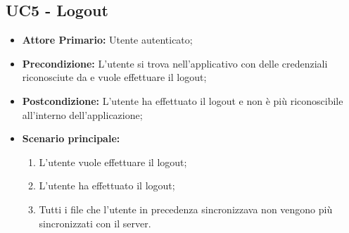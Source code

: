\subsection{UC5 - Logout}
\begin{itemize}
\item \textbf{Attore Primario:} Utente autenticato;
\item \textbf{Precondizione:} L'utente si trova nell'applicativo con delle credenziali riconosciute da  e vuole effettuare il logout;
\item \textbf{Postcondizione:} L'utente ha effettuato il logout e non è più riconoscibile all'interno dell'applicazione;
\item \textbf{Scenario principale:}
    \begin{enumerate}
    \item L'utente vuole effettuare il logout;
    \item L'utente ha effettuato il logout;
    \item Tutti i file che l'utente in precedenza sincronizzava non vengono più sincronizzati con il server.
    \end{enumerate}
\end{itemize}